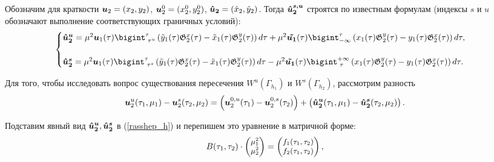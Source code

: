 Обозначим для краткости $\boldsymbol{u}_2 = (x_2,y_2)$, $\boldsymbol{u}_2^0 = (x_2^0,y_2^0)$, $\boldsymbol{\hat u_2} = (\hat x_2, \hat y_2)$.
Тогда $\boldsymbol{\hat u_2^{s,u}}$ строятся по известным формулам (индексы $s$ и $u$ обозначают выполнение соответствующих граничных условий):
\begin{equation*}
    \begin{cases}
        \v {\hat u_2^u} = 
        \mu^2 \v u_1(\tau)\bigint_{\text{ } \tau^u}^\tau \left( \tilde y_1(\tau) \mathfrak{G}_2^x(\tau) - \tilde x_1(\tau) \mathfrak{G}_2^y(\tau) \right) d \tau + 
        \mu^2 \v{ \tilde{u_1}}(\tau) \bigint_{-\infty}^\tau \left( x_1(\tau) \mathfrak{G}_2^y(\tau) - y_1(\tau) \mathfrak{G}_2^x(\tau) \right) d \tau,\\
        \\
        
        \v {\hat u_2^s} = 
        \mu^2 \v u_1(\tau)\bigint_{\text{ } \tau^s}^{\tau} \left( \tilde y_1(\tau) \mathfrak{G}_2^x(\tau) - \tilde x_1(\tau) \mathfrak{G}_2^y(\tau) \right) d \tau - 
        \mu^2 \v{ \tilde{u_1}}(\tau) \bigint_{\text{ } \tau}^{+\infty} \left( x_1(\tau) \mathfrak{G}_2^y(\tau) - y_1(\tau) \mathfrak{G}_2^x(\tau) \right) d \tau. \\
    \end{cases}
    \label{neodnor_h}
\end{equation*}

Для того, чтобы исследовать вопрос существования пересечения $W^u(\Gamma_{h_1})$ и $W^s(\Gamma_{h_2})$, рассмотрим разность 
\begin{equation}
\boldsymbol{u}_2^u (\tau_1,\mu_1) - \boldsymbol{u}_2^s (\tau_2,\mu_2) = \left(\boldsymbol{u}_2^{0,u} (\tau_1) - \boldsymbol{u}_2^{0,s} (\tau_2)\right) + \left(\boldsymbol{\hat u_2^u} (\tau_1, \mu_1) - \boldsymbol{\hat u_2^s} (\tau_2, \mu_2)\right).
\label{rasshep_h}
\end{equation}


Подставим явный вид $\boldsymbol{\hat u_2^u},\boldsymbol{\hat u_2^s}$ в (\ref{rasshep_h}) и перепишем это уравнение в матричной форме:
\begin{equation}
\small
B(\tau_1, \tau_2) \cdot
\begin{pmatrix} 
\mu_1^2 \\ \mu_2^2
\end{pmatrix} = 
\begin{pmatrix} 
f_1(\tau_1,\tau_2) \\ f_2(\tau_1,\tau_2)
\end{pmatrix},
\label{hetero_sol}
\end{equation}

